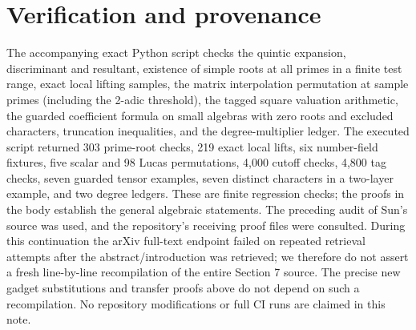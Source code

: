 \documentclass[11pt]{article}
\begin{document}
\section*{Verification and provenance}
The accompanying exact Python script checks the quintic expansion,
discriminant and resultant, existence of simple roots at all primes
in a finite test range, exact local lifting samples, the matrix
interpolation permutation at sample primes (including the 2-adic
threshold), the tagged square valuation arithmetic, the guarded
coefficient formula on small algebras with zero roots and excluded
characters, truncation inequalities, and the degree-multiplier ledger.
The executed script returned 303 prime-root checks, 219 exact local
lifts, six number-field fixtures, five scalar and 98 Lucas permutations,
4,000 cutoff checks, 4,800 tag checks, seven guarded tensor examples,
seven distinct characters in a two-layer example, and two degree ledgers.
These are finite regression checks; the proofs in the body establish
the general algebraic statements. The preceding audit of Sun's source
was used, and the repository's receiving proof files were consulted.
During this continuation the arXiv full-text endpoint failed on repeated
retrieval attempts after the abstract/introduction was retrieved;
we therefore do not assert a fresh line-by-line recompilation of the
entire Section 7 source. The precise new gadget substitutions and
transfer proofs above do not depend on such a recompilation. No
repository modifications or full CI runs are claimed in this note.
\end{document}
